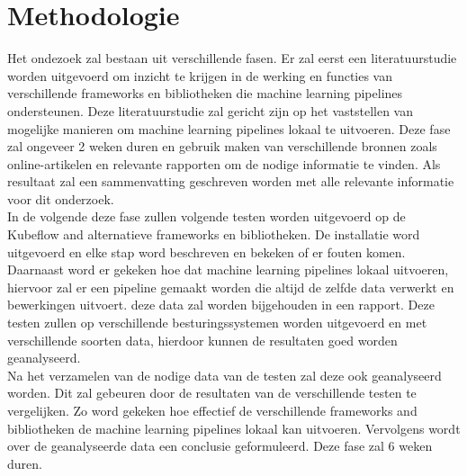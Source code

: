 

\section{Methodologie}%
\label{sec:methodologie}

Het ondezoek zal bestaan uit verschillende fasen. Er zal eerst een literatuurstudie worden uitgevoerd om inzicht te krijgen in de werking en
functies van verschillende frameworks en bibliotheken die machine learning pipelines ondersteunen.
Deze literatuurstudie zal gericht zijn op het vaststellen van mogelijke manieren om machine learning pipelines lokaal te uitvoeren. Deze fase zal ongeveer 2 weken duren en gebruik maken van verschillende bronnen zoals online-artikelen en relevante rapporten om de nodige informatie te vinden. Als resultaat zal een sammenvatting geschreven worden met alle relevante informatie voor dit onderzoek.\\

In de volgende deze fase zullen volgende testen worden uitgevoerd op de Kubeflow and alternatieve frameworks en bibliotheken. De installatie word uitgevoerd en elke stap word beschreven en bekeken of er fouten komen. Daarnaast word er gekeken hoe dat machine learning pipelines lokaal uitvoeren, hiervoor zal er een pipeline gemaakt worden die altijd de zelfde data verwerkt en bewerkingen uitvoert. deze data zal worden bijgehouden in een rapport.
Deze testen zullen op verschillende besturingssystemen worden uitgevoerd en met verschillende soorten data, hierdoor kunnen de resultaten goed worden geanalyseerd.\\

Na het verzamelen van de nodige data van de testen zal deze ook geanalyseerd worden. Dit zal gebeuren door de resultaten van de verschillende testen te vergelijken. Zo word gekeken hoe effectief de verschillende frameworks and bibliotheken de machine learning pipelines lokaal kan uitvoeren. Vervolgens wordt over de geanalyseerde data een conclusie geformuleerd.
Deze fase zal 6 weken duren.\\

